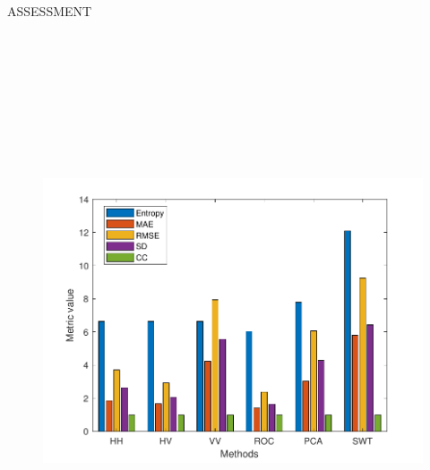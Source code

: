 \documentclass[final]{beamer}
\newlength{\onecolwid}
\newlength{\threecolwid}
\begin{document}
\begin{frame}[t]
\begin{columns}[t,totalwidth=\threecolwid]
\begin{column}{\onecolwid}
\begin{block}{\LARGE{ASSESSMENT}}
\begin{figure}[H] 
\centering
	\includegraphics[width=29cm,height=17cm]{figures/metricas.pdf}
\end{figure}

\end{block}






%
%




\end{column}
\end{columns}
\end{frame}
\end{document}
